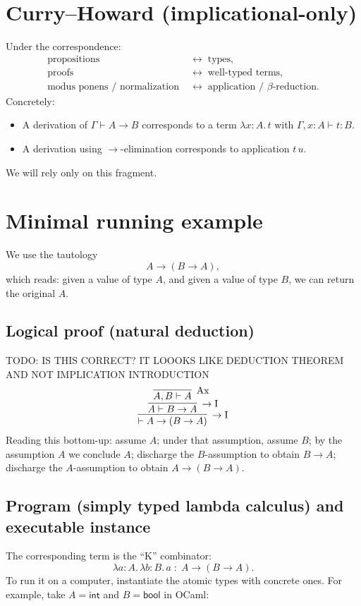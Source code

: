 \section{Curry--Howard (implicational-only)}
Under the correspondence:
\[
\begin{aligned}
\text{propositions} &\;\leftrightarrow\; \text{types}, \\
\text{proofs} &\;\leftrightarrow\; \text{well-typed terms}, \\
\text{modus ponens / normalization} &\;\leftrightarrow\; \text{application / $\beta$-reduction}.
\end{aligned}
\]
Concretely:
\begin{itemize}
  \item A derivation of $\Gamma \vdash A \to B$ corresponds to a term $\lambda x{:}A.\,t$ with $\Gamma, x{:}A \vdash t : B$.
  \item A derivation using $\to$-elimination corresponds to application $t\,u$.
\end{itemize}
We will rely only on this fragment.

\section{Minimal running example}
We use the tautology
\[
A \to (B \to A),
\]
which reads: given a value of type $A$, and given a value of type $B$, we can return the original $A$.

\subsection*{Logical proof (natural deduction)}
TODO: IS THIS CORRECT? IT LOOOKS LIKE DEDUCTION THEOREM AND NOT IMPLICATION INTRODUCTION
\[
\infer[\to\mathrm{I}]{\vdash A \to (B \to A)}{
  \infer[\to\mathrm{I}]{A \vdash B \to A}{
    \infer[\mathrm{Ax}]{A, B \vdash A}{}
  }
}
\]
Reading this bottom-up: assume $A$; under that assumption, assume $B$; by the assumption $A$ we conclude $A$; discharge the $B$-assumption to obtain $B \to A$; discharge the $A$-assumption to obtain $A \to (B \to A)$.

\subsection*{Program (simply typed lambda calculus) and executable instance}
The corresponding term is the ``K'' combinator:
\[
\lambda a{:}A.\,\lambda b{:}B.\, a \;:\; A \to (B \to A).
\]
To run it on a computer, instantiate the atomic types with concrete ones. For example, take $A = \mathsf{int}$ and $B = \mathsf{bool}$ in OCaml:

